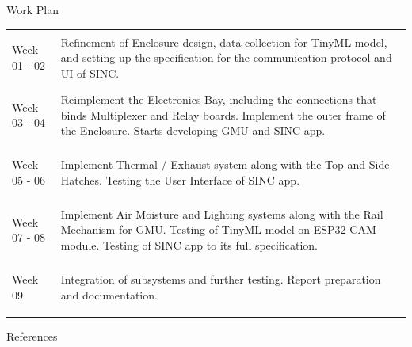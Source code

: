 \documentclass{beamer}
\begin{document}
\begin{frame} {Work Plan}

    \renewcommand\arraystretch{1.75}
    \renewcommand\midrule{{\color{leafColorSecondary} \vspace{-8pt}\rule{\textwidth}{0.75pt}\vspace{8pt}}}


    \begin{tabularx} {\textwidth} {
            >{\bfseries \raggedright \arraybackslash}m{2cm} >{\raggedright \arraybackslash}X
        }

        Week 01 - 02
        &
        Refinement of Enclosure design, data collection for TinyML model, and setting up
        the specification for the communication protocol and UI of SINC.
        \\ \midrule

        Week 03 - 04
        &
        Reimplement the Electronics Bay, including the connections that binds Multiplexer and
        Relay boards. Implement the outer frame of the Enclosure. Starts developing GMU and
        SINC app.
        \\ \midrule

        Week 05 - 06
        &
        Implement Thermal / Exhaust system along with the Top and Side Hatches. Testing
        the User Interface of SINC app.
        \\ \midrule

        Week 07 - 08
        &
        Implement Air Moisture and Lighting systems along with the Rail Mechanism for GMU. Testing
        of TinyML model on ESP32 CAM module. Testing of SINC app to its full specification.
        \\ \midrule

        Week 09
        &
        Integration of subsystems and further testing. Report preparation and documentation.

        \\

    \end{tabularx}

\end{frame}

\begin{frame} {References}

    \nocite{interEsp, ieeeComp, ieeeGreenAI, tinymlEnv}

    \nopagebreak

    \begingroup \let\clearpage\relax
    \printbibliography[heading = none] %
    \endgroup

\end{frame}
\end{document}
